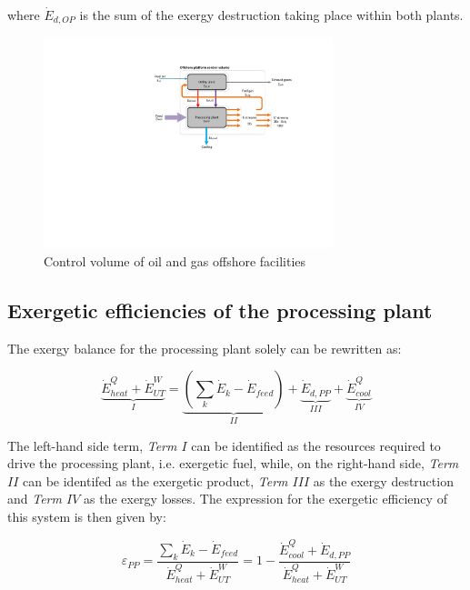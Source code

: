 \documentclass[times,3p]{elsarticle}
\begin{document}
	where $\dot{E}_{d,OP}$ is the sum of the exergy destruction taking place within both plants. 

\begin{figure}[htbp]
	\centering
	\includegraphics[width=0.75\textwidth]{control_volume.pdf}
	\caption{Control volume of oil and gas offshore facilities}
	\label{fig:control_volume}
\end{figure}

\subsection{Exergetic efficiencies of the processing plant}
 	
The exergy balance for the processing plant solely can be rewritten as:

\begin{equation}
	\underbrace{\dot{E}^{Q}_{heat}+\dot{E}^{W}_{UT}}_{I}=\underbrace{\left(\sum_k\dot{E}_k-\dot{E}_{feed}\right)}_{II}+\underbrace{\dot{E}_{d,PP}}_{III}+\underbrace{\dot{E}^{Q}_{cool}}_{IV}
\end{equation}
	
The left-hand side term, \emph{Term $I$} can be identified as the resources required to drive the processing plant, i.e. exergetic fuel, while, on the right-hand side, \emph{Term $II$} can be identifed as the exergetic product, \emph{Term $III$} as the exergy destruction and \emph{Term $IV$} as the exergy losses. The expression for the exergetic efficiency of this system is then given by:

\begin{equation}
	\varepsilon_{PP}=\frac{\sum_k\dot{E}_k-\dot{E}_{feed}}{\dot{E}^{Q}_{heat}+\dot{E}^{W}_{UT}}=1-\frac{\dot{E}^{Q}_{cool}+\dot{E}_{d,PP}}{\dot{E}^{Q}_{heat}+\dot{E}^{W}_{UT}}
\end{equation}
\end{document}
